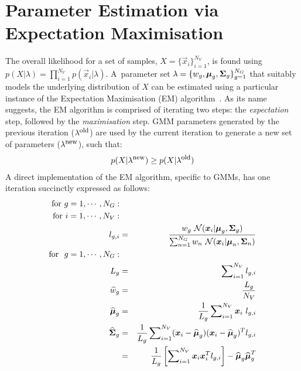 \section{Parameter Estimation via Expectation Maximisation}


\noindent
The overall likelihood for a set of samples, $X=\{\Vec{x}_i\}_{i=1}^{N_V}$,
is found using $p(X | \lambda) = \prod\nolimits_{i=1}^{N_V} p(\Vec{x}_i | \lambda)$.
A~parameter set $\lambda = \{ w_g, {\boldsymbol{\mu}}_g, {\boldsymbol{\Sigma}}_g \}_{g=1}^{N_G}$
that suitably models the underlying distribution of $X$ can be estimated using a particular instance of the Expectation Maximisation (EM) algorithm~\cite{Dempster77, McLachlan-2008, Moon96, Redner84}.
As its name suggests, the EM algorithm is comprised of iterating two steps: the {\it expectation} step, followed by the {\it maximisation} step.
GMM parameters generated by the previous iteration ($\lambda^{\mbox{\footnotesize old}}$) are used
by the current iteration to generate a new set of parameters ($\lambda^{\mbox{\footnotesize new}}$), such that:
%
\begin{eqnarray}
	p(X|\lambda^{\mbox{\footnotesize new}}) \geq p(X|\lambda^{\mbox{\footnotesize old}})
\end{eqnarray}
%
A direct implementation of the EM algorithm, specific to GMMs, has one iteration succinctly expressed as follows:
%
\begin{eqnarray}
  \mbox{for} ~g=1, \cdots, N_G: \nonumber \\
  \mbox{for} ~i=1, \cdots, N_V: \nonumber \\
  l_{g,i} & = & \frac{w_g ~ {{\mathcal{N}}}( {\boldsymbol{x}}_i | {\boldsymbol{\mu}}_g, {\boldsymbol{\Sigma}}_g )}
  {\sum\nolimits_{n=1}^{N_G} w_n ~ {{\mathcal{N}}}( {\boldsymbol{x}}_i | {\boldsymbol{\mu}}_n, {\boldsymbol{\Sigma}}_n )} \label{eqn:aposteriori}\\
\mbox{for} ~~ g  =  1, \cdots, N_G:  \nonumber \\
	L_g & = & \sum\nolimits_{i=1}^{N_V} l_{g,i} \label{eqn:L_k} \\
	\widehat{w}_g & = & \frac{L_g}{N_V} \label{eqn:m_k} \\
	\widehat{{\boldsymbol{\mu}}}_g & = & \frac{1}{L_g} \sum\nolimits_{i=1}^{N_V} {\boldsymbol{x}}_i ~ l_{g,i}  \label{eqn:em_mean} \\
	\widehat{{\boldsymbol{\Sigma}}}_g & = & \frac{1}{L_g} \sum\nolimits_{i=1}^{N_V} ({\boldsymbol{x}}_i - \widehat{{\boldsymbol{\mu}}}_g)({\boldsymbol{x}}_i - \widehat{{\boldsymbol{\mu}}}_g)^T l_{g,i} \label{eqn:em_covA} \\
	& = &  \frac{1}{L_g} \left[ \sum\nolimits_{i=1}^{N_V} {\boldsymbol{x}}_i {\boldsymbol{x}}_i^T l_{g,i} \right] - \widehat{{\boldsymbol{\mu}}}_g \widehat{{\boldsymbol{\mu}}}_g^T \label{eqn:em_covB} \\
\end{eqnarray}

